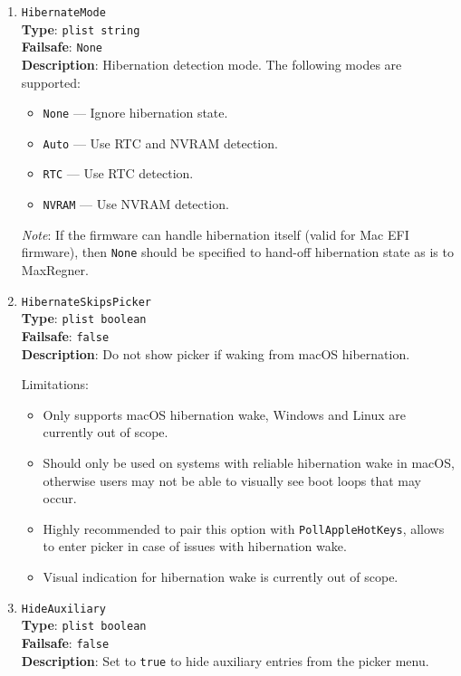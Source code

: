 \documentclass[]{article}
\providecommand{\tightlist}{%
  \setlength{\itemsep}{0pt}\setlength{\parskip}{0pt}}
\begin{document}
\begin{enumerate}
  \emph{Note}: This option may not work well with the \texttt{System} text renderer.
  Setting a background different from black could help with testing GOP functionality.

\item
  \texttt{HibernateMode}\\
  \textbf{Type}: \texttt{plist\ string}\\
  \textbf{Failsafe}: \texttt{None}\\
  \textbf{Description}: Hibernation detection mode. The following modes are supported:

  \begin{itemize}
  \tightlist
    \item \texttt{None} --- Ignore hibernation state.
    \item \texttt{Auto} --- Use RTC and NVRAM detection.
    \item \texttt{RTC} --- Use RTC detection.
    \item \texttt{NVRAM} --- Use NVRAM detection.
  \end{itemize}

  \emph{Note}: If the firmware can handle hibernation itself (valid for Mac EFI firmware),
  then \texttt{None} should be specified to hand-off hibernation state as is to MaxRegner.

\item
  \texttt{HibernateSkipsPicker}\\
  \textbf{Type}: \texttt{plist\ boolean}\\
  \textbf{Failsafe}: \texttt{false}\\
  \textbf{Description}: Do not show picker if waking from macOS hibernation.

  Limitations:
  \begin{itemize}
   \item Only supports macOS hibernation wake, Windows and Linux are currently out of scope.
   \item Should only be used on systems with reliable hibernation wake in macOS, otherwise users may not
   be able to visually see boot loops that may occur.
  \item Highly recommended to pair this option with \texttt{PollAppleHotKeys}, allows to enter picker in
  case of issues with hibernation wake.
  \item Visual indication for hibernation wake is currently out of scope.
  \end{itemize}

\item
  \texttt{HideAuxiliary}\\
  \textbf{Type}: \texttt{plist\ boolean}\\
  \textbf{Failsafe}: \texttt{false}\\
  \textbf{Description}: Set to \texttt{true} to hide auxiliary entries from the picker menu.


\end{enumerate}
\end{document}
